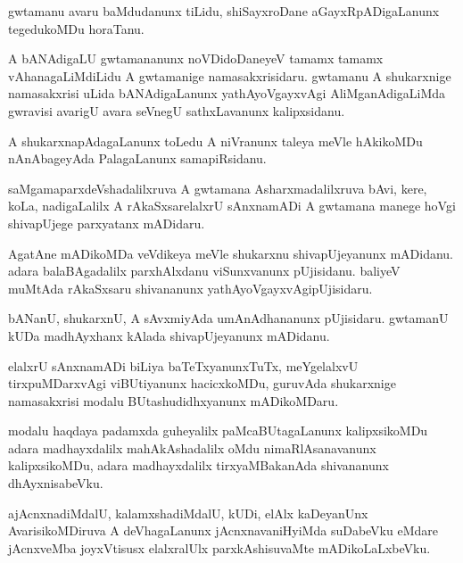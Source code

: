 \documentclass{article}
\begin{document}
\begin{mn}
gwtamanu  avaru  baMdudanunx  tiLidu,  shiSayxroDane  aGayxRpADigaLanunx  tegedukoMDu  horaTanu.
\end{mn}

\begin{mn}
A  bANAdigaLU  gwtamananunx  noVDidoDaneyeV  tamamx  tamamx  vAhanagaLiMdiLidu  A  gwtamanige  
namasakxrisidaru.  gwtamanu  A  shukarxnige  namasakxrisi  uLida  bANAdigaLanunx  yathAyoVgayxvAgi  
AliMganAdigaLiMda  gwravisi  avarigU  avara  seVnegU  sathxLavanunx  kalipxsidanu.
\end{mn}

\begin{mn}
A  shukarxnapAdagaLanunx  toLedu  A  niVranunx  taleya  meVle  hAkikoMDu  nAnAbageyAda  PalagaLanunx  samapiRsidanu.
\end{mn}

\begin{mn}
saMgamaparxdeVshadalilxruva  A  gwtamana  Asharxmadalilxruva  bAvi,  kere,  koLa,  nadigaLalilx  A  rAkaSxsarelalxrU  
sAnxnamADi  A  gwtamana  manege  hoVgi  shivapUjege  parxyatanx mADidaru.
\end{mn}

\begin{mn}
AgatAne  mADikoMDa  veVdikeya  meVle  shukarxnu  shivapUjeyanunx  mADidanu.  adara  balaBAgadalilx  parxhAlxdanu  
viSunxvanunx  pUjisidanu.  baliyeV  muMtAda  rAkaSxsaru  shivananunx  yathAyoVgayxvAgipUjisidaru.
\end{mn}

\begin{mn}
bANanU,  shukarxnU,  A  sAvxmiyAda  umAnAdhananunx  pUjisidaru.  gwtamanU  kUDa  madhAyxhanx  kAlada  
shivapUjeyanunx  mADidanu.  
\end{mn}

\begin{mn}
elalxrU  sAnxnamADi  biLiya  baTeTxyanunxTuTx,  meYgelalxvU  tirxpuMDarxvAgi  viBUtiyanunx  hacicxkoMDu,  
guruvAda  shukarxnige  namasakxrisi  modalu  BUtashudidhxyanunx  mADikoMDaru.
\end{mn}

\begin{mn}
modalu  haqdaya  padamxda  guheyalilx  paMcaBUtagaLanunx  kalipxsikoMDu  adara  madhayxdalilx  mahAkAshadalilx  
oMdu  nimaRlAsanavanunx  kalipxsikoMDu,  adara  madhayxdalilx  tirxyaMBakanAda  shivananunx  dhAyxnisabeVku.
\end{mn}

\begin{mn}
ajAcnxnadiMdalU,  kalamxshadiMdalU,  kUDi,  elAlx  kaDeyanUnx  AvarisikoMDiruva  A  deVhagaLanunx  
jAcnxnavaniHyiMda  suDabeVku  eMdare  jAcnxveMba  joyxVtisusx  elalxralUlx  parxkAshisuvaMte  mADikoLaLxbeVku.
\end{mn}
\end{document}
